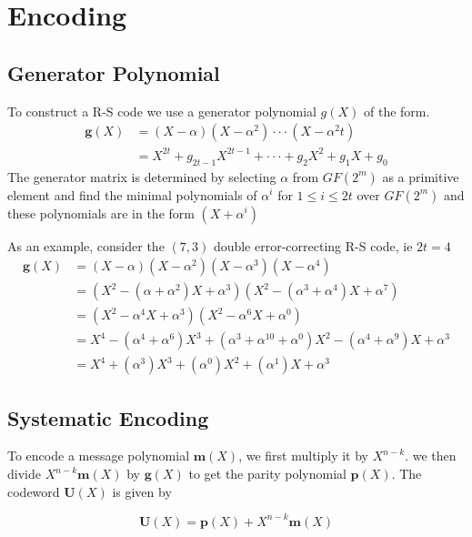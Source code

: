 \documentclass[fontsize=12pt]{article}
\begin{document}
\section{Encoding}
\subsection{Generator Polynomial}
To construct a R-S code we use a generator polynomial $g(X)$ of the form.
\begin{equation}
\begin{split}
\mathbf{g}(X) &=(X-\alpha)(X-\alpha^2)\cdot\cdot\cdot(X-\alpha^2t)\\
	 &=X^{2t} + g_{2t-1}X^{2t-1}+\cdot\cdot\cdot +g_2X^2 + g_1X+g_0
	\end{split}
	\label{five}
\end{equation}
The generator matrix is determined by selecting $\alpha$ from $GF(2^m)$ as a primitive element and find the minimal polynomials of $\alpha^i$ for $1 \leq i \leq 2t$ over $GF(2^m)$ and these polynomials are in the form $(X+\alpha^i)$

As an example, consider the $(7,3)$ double error-correcting R-S code, ie $2t=4$
\begin{equation} 
\begin{split}
\mathbf{g}(X) & = (X-\alpha)(X-\alpha^2)(X-\alpha^3)(X-\alpha^4) \\
 & = (X^2- (\alpha +\alpha^2)X + \alpha^3) (X^2 - (\alpha^3 +\alpha^4) X +\alpha^7) \\
  & = (X^2- \alpha^4X + \alpha^3) (X^2 - \alpha^6 X +\alpha^0) \\
   & = X^4- (\alpha^4 +\alpha^6)X^3 + (\alpha^3 +\alpha^{10} +\alpha^0)X^2 - (\alpha^4 +\alpha^9) X +\alpha^3\\
   &=X^4 + (\alpha^3)X^3 + (\alpha^0)X^2 + (\alpha^1) X +\alpha^3
\end{split}
\end{equation}
\subsection{Systematic Encoding}
To encode a message polynomial $\mathbf{m}(X)$, we first multiply it by $X^{n-k}$. we then divide $X^{n-k}\mathbf{m}(X)$ by $\mathbf{g}(X)$ to get the parity polynomial $\mathbf{p}(X)$. The codeword $\mathbf{U}(X)$ is given by

\begin{equation}
\mathbf{U}(X)= \mathbf{p}(X) + X^{n-k}\mathbf{m}(X)
\end{equation}
\end{document}

